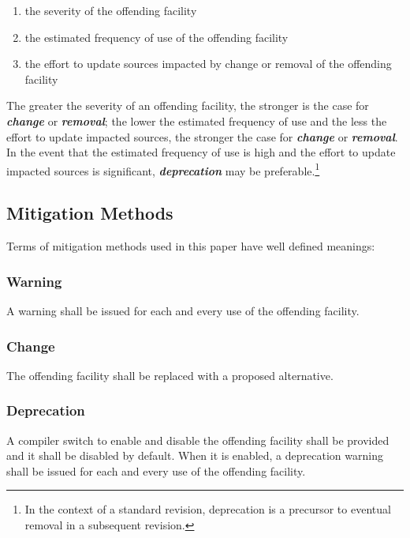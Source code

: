 \documentclass[10pt,a4paper,leqno,fleqn]{article}
\renewcommand{\emph}[1]{\textbf{\textit{#1}}}
\begin{document}
\begin{enumerate}[itemindent=-0.75em]
\item the severity of the \gls{offending facility}
\item the estimated frequency of use of the \gls{offending facility}
\item the effort to update sources impacted by change or removal of the
\gls{offending facility}
\end{enumerate}

\noindent The greater the severity of an \gls{offending facility}, the stronger
is the case for \emph{change} or \emph{removal}; the lower the estimated
frequency of use and the less the effort to update impacted sources, the
stronger the case for \emph{change} or \emph{removal}. In the event that
the estimated frequency of use is high and the effort to update impacted
sources is significant, \emph{deprecation} may be preferable.\footnote
{In the context of a standard revision, deprecation is a precursor to eventual
removal in a subsequent revision.}


\subsection{Mitigation Methods}

Terms of mitigation methods used in this paper have well defined meanings:

\subsubsection{Warning}

A warning shall be issued for each and every use of the
\gls{offending facility}.

\subsubsection{Change}

The \gls{offending facility} shall be replaced with a proposed alternative.

\subsubsection{Deprecation}

A compiler switch to enable and disable the \gls{offending facility} shall
be provided and it shall be disabled by default. When it is enabled, a
deprecation warning shall be issued for each and every use of the
\gls{offending facility}.
\end{document}

